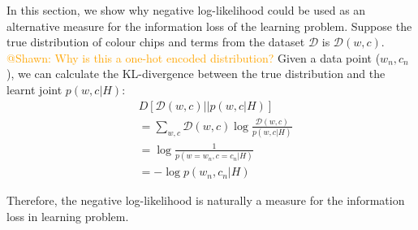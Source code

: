 \documentclass[11pt]{article}
\begin{document}
In this section, we show why negative log-likelihood could be used as an alternative measure for the information loss of the learning problem. Suppose the true distribution of colour chips and terms from the dataset $\mathcal{D}$ is $\mathcal{D}(w,c)$. \textcolor{orange}{@Shawn: Why is this a one-hot encoded distribution?} Given a data point ($w_n,c_n$), we can calculate the KL-divergence between the true distribution and the learnt joint $p(w,c|H)$:
\begin{equation}
    \begin{split}
        & D[\mathcal{D}(w,c)||p(w,c|H)] \\ 
        & = \sum_{w,c} \mathcal{D}(w,c)\log \frac{\mathcal{D}(w,c)}{p(w,c|H)} \\
        & = \log \frac{1}{p(w=w_n,c=c_n|H)} \\
        & = -\log p(w_n,c_n|H)
    \end{split}
    \label{eq:learn_info_loss}
\end{equation}

Therefore, the negative log-likelihood is naturally a measure for the information loss in learning problem.
\end{document}
